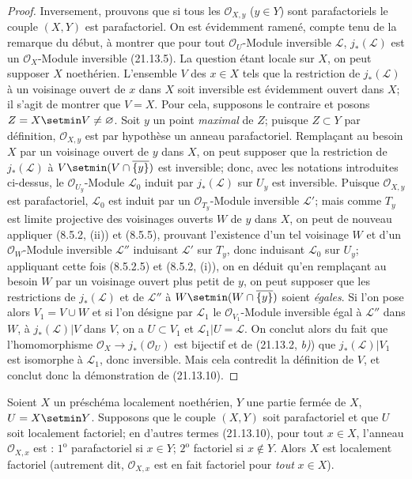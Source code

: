 \begin{proof}
Inversement, prouvons que si tous les $\mathcal O_{X,y}$ ($y\in Y$) sont
parafactoriels le couple $(X,Y)$ est parafactoriel. On est évidemment ramené, compte
tenu de la remarque du début, à montrer que pour tout $\mathcal O_U$-Module inversible
$\mathscr L$, $j_*(\mathscr L)$ est un $\mathcal O_X$-Module inversible (21.13.5).
La question étant locale sur $X$, on peut supposer $X$ noethérien. L'ensemble $V$ des
$x\in X$ tels que la restriction de $j_*(\mathscr L)$ à un voisinage ouvert de $x$
dans $X$ soit inversible est évidemment ouvert dans $X$; il s'agit de montrer que
$V=X$. Pour cela, supposons le contraire et posons $Z=X\setmin V\neq\varnothing$. Soit $y$
un point \emph{maximal} de $Z$; puisque $Z\subset Y$ par définition,
$\mathcal O_{X,y}$ est par hypothèse un anneau parafactoriel. Remplaçant au besoin
$X$ par un voisinage ouvert de $y$ dans $X$, on peut supposer que la restriction de
$j_*(\mathscr L)$
à $V\setmin(V\cap\overline{\{y\}})$ est inversible; donc, avec les notations introduites
ci-dessus, le $\mathcal O_{U_y}$-Module $\mathscr L_0$ induit par $j_*(\mathscr L)$
sur $U_y$ est inversible. Puisque $\mathcal O_{X,y}$ est parafactoriel,
$\mathscr L_0$ est induit par un $\mathcal O_{T_y}$-Module inversible $\mathscr L'$;
mais comme $T_y$ est limite projective des voisinages ouverts $W$ de $y$ dans $X$,
on peut de nouveau appliquer (8.5.2, (ii)) et (8.5.5), prouvant l'existence d'un tel
voisinage $W$ et d'un $\mathcal O_W$-Module inversible $\mathscr L''$ induisant
$\mathscr L'$ sur $T_y$, donc induisant $\mathscr L_0$ sur $U_y$; appliquant cette
fois (8.5.2.5) et (8.5.2, (i)), on en déduit qu'en remplaçant au besoin $W$ par un
voisinage ouvert plus petit de $y$, on peut supposer que les restrictions de
$j_*(\mathscr L)$ et de $\mathscr L''$ à
$W\setmin(W\cap\overline{\{y\}})$ soient \emph{égales}. Si l'on pose alors $V_1=V\cup W$ et si
l'on désigne par $\mathscr L_1$ le $\mathcal O_{V_1}$-Module inversible égal à
$\mathscr L''$ dans $W$, à $j_*(\mathscr L)|V$ dans $V$, on a $U\subset V_1$ et
$\mathscr L_1|U=\mathscr L$. On conclut alors du fait que l'homomorphisme
$\mathcal O_X\to j_*(\mathcal O_U)$ est bijectif et de (21.13.2, \emph{b)}) que
$j_*(\mathscr L)|V_1$ est isomorphe à $\mathscr L_1$, donc inversible. Mais cela
contredit la définition de $V$, et conclut donc la démonstration de (21.13.10).
\end{proof}

\begin{corollary}[21.13.11]
\label{IV.21.13.11}
Soient $X$ un préschéma localement noethérien, $Y$ une partie fermée de $X$,
$U=X\setmin Y$. Supposons que le couple $(X,Y)$ soit parafactoriel et que $U$ soit
localement factoriel; en d'autres termes \textup{(21.13.10)}, pour tout $x\in X$, l'anneau
$\mathcal O_{X,x}$ est : $1^{\mathrm o}$ parafactoriel si $x\in Y$;
$2^{\mathrm o}$ factoriel si $x\notin Y$. Alors $X$ est localement factoriel
\textup{(autrement dit, $\mathcal O_{X,x}$ est en fait factoriel pour \emph{tout} $x\in X$)}.
\end{corollary}

